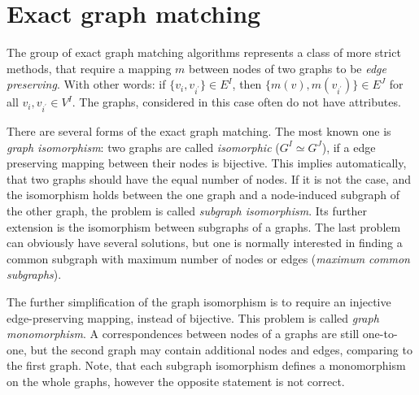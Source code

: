 \section{Exact graph matching}
The group of exact graph matching algorithms represents a class of more strict methods, that require a mapping $m$ between nodes of two graphs to be \emph{edge preserving}. With other words: if $\{v_i,v_{i^\prime}\}\in E^I$, then $\{m(v),m(v_{i^\prime})\}\in E^J$ for all $v_i,v_{i^\prime}\in V^I$. The graphs, considered in this case often do not have attributes.

There are several forms of the exact graph matching. The most known one is \emph{graph isomorphism}: two graphs are called \emph{isomorphic} ($G^I\simeq G^J$), if a edge preserving mapping between their nodes is bijective. This implies automatically, that two graphs should have the equal number of nodes. If it is not the case, and the isomorphism holds between the one graph and a node-induced subgraph of the other graph, the problem is called \emph{subgraph isomorphism}. Its further extension is the isomorphism between subgraphs of a graphs. The last problem can obviously have several solutions, but one is normally interested in finding a common subgraph with maximum number of nodes or edges (\emph{maximum common subgraphs}).  

The further simplification of the graph isomorphism is to require an injective edge-preserving mapping, instead of bijective. This problem is called \emph{graph monomorphism}. A correspondences between nodes of a graphs are still one-to-one, but the second graph may contain additional nodes and edges, comparing to the first graph. Note, that each subgraph isomorphism defines a monomorphism on the whole graphs, however the opposite statement is not correct.

